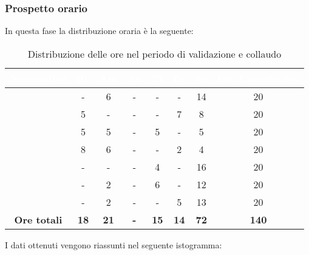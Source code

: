 \subsubsection{Prospetto orario}
In questa fase la distribuzione oraria è la seguente:
\begin{table}[H]
	\begin{center}
		\begin{tabular}{ c c c c c c c c }
		\rowcolor{darkblue} 
		\textcolor{white}{\textbf{Nominativo}} & \textcolor{white}{\textbf{Re}} & \textcolor{white}{\textbf{Am}} & \textcolor{white}{\textbf{An}} & \textcolor{white}{\textbf{Pt}} & \textcolor{white}{\textbf{Pr}} & \textcolor{white}{\textbf{Ve}} & \textcolor{white}{\textbf{Ore Complessive}} \\ \hline
		\BL & -  & 6  & - & - & - & 14 & 20 \\ \hline
		\FF & 5  & -  & - & - & 7 & 8  & 20 \\ \hline
		\MM & 5 & 5 & - & 5 & - & 5  & 20 \\ \hline
		\PC & 8 & 6  & - & - & 2 & 4 & 20 \\ \hline
		\TG & -  & - & - & 4 & - & 16 & 20 \\ \hline
		\TL & -  & 2 & - & 6 & - & 12 & 20 \\ \hline
		\VD & -  & 2  & - & - & 5 & 13  & 20 \\ \hline
		\textbf{Ore totali} & \textbf{18} & \textbf{21} & \textbf{-} & \textbf{15} & \textbf{14} & \textbf{72} & \textbf{140} \\ \hline
		\end{tabular}
	\caption{Distribuzione delle ore nel periodo di validazione e collaudo}
	\end{center}
\end{table}
I dati ottenuti vengono riassunti nel seguente istogramma:
